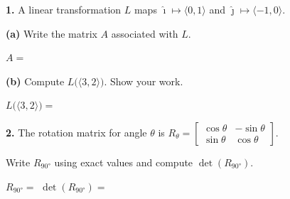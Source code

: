 \documentclass[10pt]{article}
\begin{document}
\namedateperiod
\vspace{0.12in}

\begin{notesbox}
\textbf{1.} A linear transformation $L$ maps $\hat{\imath}\mapsto\langle0,1\rangle$
and $\hat{\jmath}\mapsto\langle-1,0\rangle$.

\vspace{0.06in}
\textbf{(a)} Write the matrix $A$ associated with $L$.

\vspace{0.06in}
\hspace{1em}$A = $ 

\vspace{0.12in}
\textbf{(b)} Compute $L\bigl(\langle3,2\rangle\bigr)$. Show your work.

\vspace{0.06in}

\vspace{0.04in}
$L\bigl(\langle3,2\rangle\bigr) = $ 
\end{notesbox}

\vspace{0.10in}

\begin{notesbox}
\textbf{2.} The rotation matrix for angle $\theta$ is
$R_\theta = \begin{bmatrix}\cos\theta&-\sin\theta\\\sin\theta&\cos\theta\end{bmatrix}$.

\vspace{0.06in}
Write $R_{90°}$ using exact values and compute $\det(R_{90°})$.

\vspace{0.06in}
$R_{90°} = $ 
\qquad $\det(R_{90°}) = $ 

\vspace{0.04in}
\end{notesbox}
\end{document}
